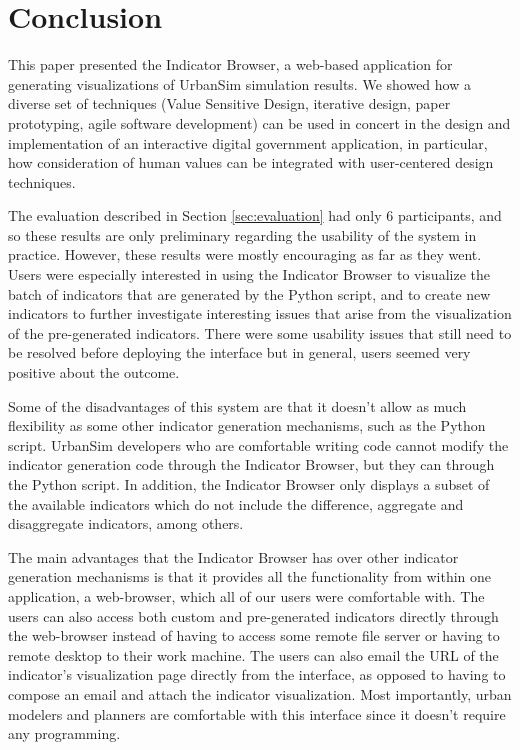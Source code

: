 
\section{Conclusion}
\label{sec:conclusion}

This paper presented the Indicator Browser, a web-based application for
generating visualizations of UrbanSim simulation results. We showed how a
diverse set of techniques (Value Sensitive Design, iterative design, paper
prototyping, agile software development) can be used in concert
in the design and implementation of an interactive digital government
application, in particular, how consideration of human values can be
integrated with user-centered design techniques.

The evaluation described in Section \ref{sec:evaluation} had only 6
participants, and so these results are only preliminary
regarding the usability of the system in practice.  However, these results
were mostly encouraging as far as they went.  Users were especially
interested in using the Indicator Browser to visualize the batch of
indicators that are generated by the Python script, and to create new
indicators to further investigate interesting issues that arise from the
visualization of the pre-generated indicators.  There were some usability
issues that still need to be resolved before deploying the interface but in
general, users seemed very positive about the outcome.

Some of the disadvantages of this system are that it doesn't allow as much
flexibility as some other indicator generation mechanisms, such as the
Python script. UrbanSim developers who are comfortable writing code cannot
modify the indicator generation code through the Indicator Browser, but
they can through the Python script. In addition, the Indicator Browser only
displays a subset of the available indicators which do not include the
difference, aggregate and disaggregate indicators, among others.

The main advantages that the Indicator Browser has over other indicator
generation mechanisms is that it provides all the functionality from within
one application, a web-browser, which all of our users were comfortable
with. The users can also access both custom and pre-generated indicators
directly through the web-browser instead of having to access some remote
file server or having to remote desktop to their work machine. The users
can also email the URL of the indicator's visualization page
directly from the interface, as opposed to
having to compose an email and attach the indicator visualization.  Most
importantly, urban modelers and planners are comfortable with this
interface since it doesn't require any programming.


